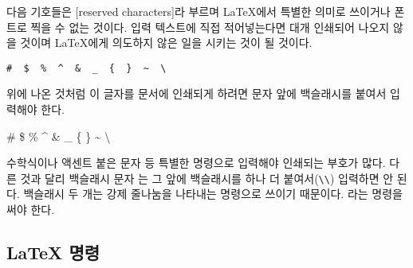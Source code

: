 다음 기호들은 [reserved characters]라 부르며 \LaTeX 에서 특별한 의미로 쓰이거나
폰트로 찍을 수 없는 것이다. 입력 텍스트에 직접 적어넣는다면 대개 인쇄되어 나오지 않을 것이며 
\LaTeX 에게 의도하지 않은 일을 시키는 것이 될 것이다.
\begin{code}
\verb.#  $  %  ^  &  _  {  }  ~  \ . %
\end{code}

위에 나온 것처럼 이 글자를 문서에 인쇄되게 하려면 문자 앞에 백슬래시를 붙여서 입력해야 한다.

\begin{example}
\# \$ \% \^{} \& \_ \{ \} \~{}
\textbackslash
\end{example}

수학식이나 액센트 붙은 문자 등 특별한 명령으로 입력해야 인쇄되는 부호가 많다. 
다른 것과 달리 백슬래시 문자 \bs 는 그 앞에 백슬래시를 하나 더 붙여서(\verb|\\|) 입력하면 안 된다.
백슬래시 두 개는 강제 줄나눔을 나타내는 명령으로 쓰이기 때문이다. 라는 명령을 써야 한다.


\subsection{\LaTeX{} 명령}

